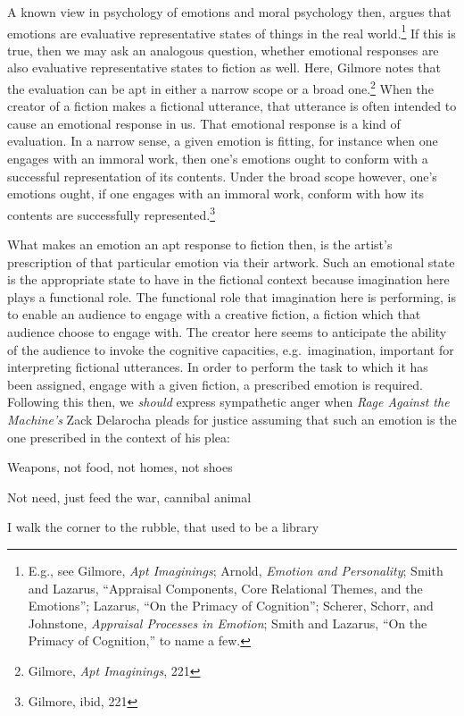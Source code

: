 \documentclass[phdthesis,12pt,final,a4paper]{wuthesis}
\theoremstyle{definition}
\theoremstyle{definition}
\theoremstyle{definition}
\theoremstyle{definition}
\theoremstyle{remark}
\begin{document}
A known view in psychology of emotions and moral psychology then, argues that emotions are evaluative representative states of things in the real world.\footnote{E.g., see Gilmore, \emph{Apt {Imaginings}}; Arnold, \emph{Emotion and {Personality}}; Smith and Lazarus, {``Appraisal {Components}, {Core Relational Themes}, and the {Emotions}''}; Lazarus, {``On the {Primacy} of {Cognition}''}; Scherer, Schorr, and Johnstone, \emph{Appraisal Processes in Emotion}; Smith and Lazarus, {``On the {Primacy} of {Cognition},''} to name a few.} If this is true, then we may ask an analogous question, whether emotional responses are also evaluative representative states to fiction as well. Here, Gilmore notes that the evaluation can be apt in either a narrow scope or a broad one.\footnote{Gilmore, \emph{Apt {Imaginings}}, 221} When the creator of a fiction makes a fictional utterance, that utterance is often intended to cause an emotional response in us. That emotional response is a kind of evaluation. In a narrow sense, a given emotion is fitting, for instance when one engages with an immoral work, then one's emotions ought to conform with a successful representation of its contents. Under the broad scope however, one's emotions ought, if one engages with an immoral work, conform with how its contents are successfully represented.\footnote{Gilmore, ibid, 221}

What makes an emotion an apt response to fiction then, is the artist's prescription of that particular emotion via their artwork. Such an emotional state is the appropriate state to have in the fictional context because imagination here plays a functional role. The functional role that imagination here is performing, is to enable an audience to engage with a creative fiction, a fiction which that audience choose to engage with. The creator here seems to anticipate the ability of the audience to invoke the cognitive capacities, e.g.~imagination, important for interpreting fictional utterances. In order to perform the task to which it has been assigned, engage with a given fiction, a prescribed emotion is required. Following this then, we \emph{should} express sympathetic anger when \emph{Rage Against the Machine's} Zack Delarocha pleads for justice assuming that such an emotion is the one prescribed in the context of his plea:

Weapons, not food, not homes, not shoes

Not need, just feed the war, cannibal animal

I walk the corner to the rubble, that used to be a library
\end{document}
